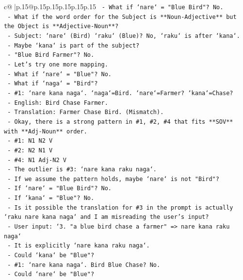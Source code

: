 \documentclass{article}
\begin{document}
{\begin{supertabular}{c@{$\;$}|p{.15\linewidth}@{}p{.15\linewidth}p{.15\linewidth}p{.15\linewidth}p{.15\linewidth}p{.15\linewidth}}
{{{\texttt{        {-} What if `nare` = "Blue Bird"? No.} \\
\texttt{        {-} What if the word order for the Subject is **Noun{-}Adjective** but the Object is **Adjective{-}Noun**?} \\
\texttt{          {-} Subject: `nare` (Bird) `raku` (Blue)? No, `raku` is after `kana`.} \\
\texttt{          {-} Maybe `kana` is part of the subject?} \\
\texttt{          {-} "Blue Bird Farmer"? No.} \\
\texttt{    {-} Let's try one more mapping.} \\
\texttt{      {-} What if `nare` = "Blue"? No.} \\
\texttt{      {-} What if `naga` = "Bird"?} \\
\texttt{        {-} \#1: `nare kana naga`. `naga`=Bird. `nare`=Farmer? `kana`=Chase?} \\
\texttt{          {-} English: Bird Chase Farmer.} \\
\texttt{          {-} Translation: Farmer Chase Bird. (Mismatch).} \\
\texttt{    {-} Okay, there is a strong pattern in \#1, \#2, \#4 that fits **SOV** with **Adj{-}Noun** order.} \\
\texttt{      {-} \#1: N1 N2 V} \\
\texttt{      {-} \#2: N2 N1 V} \\
\texttt{      {-} \#4: N1 Adj{-}N2 V} \\
\texttt{    {-} The outlier is \#3: `nare kana raku naga`.} \\
\texttt{      {-} If we assume the pattern holds, maybe `nare` is not "Bird"?} \\
\texttt{      {-} If `nare` = "Blue Bird"? No.} \\
\texttt{      {-} If `kana` = "Blue"? No.} \\
\texttt{      {-} Is it possible the translation for \#3 in the prompt is actually `raku nare kana naga` and I am misreading the user's input?} \\
\texttt{        {-} User input: `3. "a blue bird chase a farmer" => nare kana raku naga`} \\
\texttt{        {-} It is explicitly `nare kana raku naga`.} \\
\texttt{      {-} Could `kana` be "Blue"?} \\
\texttt{        {-} \#1: `nare kana naga`. Bird Blue Chase? No.} \\
\texttt{      {-} Could `nare` be "Blue"?} \\
}}}
\end{supertabular}}
\end{document}
